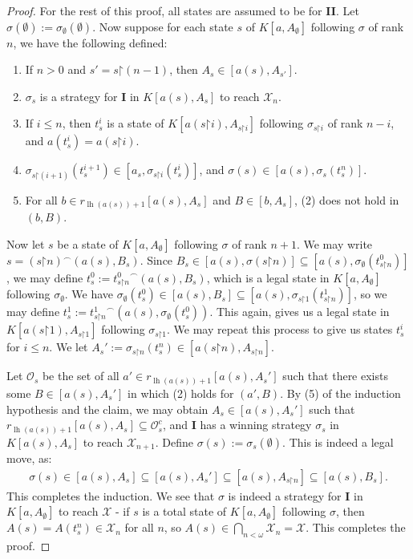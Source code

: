 \documentclass[11pt,reqno]{amsart}
\theoremstyle{plain}
\numberwithin{equation}{section}
\theoremstyle{definition}
\newcommand{\func}{\operatorname}
\newcommand{\cal}{\mathcal}
\newcommand{\restrictedto}{\mathord{\upharpoonright}}
\newcommand{\X}{\cal{X}}
\newcommand{\lh}{\func{lh}}
\renewcommand{\O}{\cal{O}}
\begin{document}
\begin{proof}
    For the rest of this proof, all states are assumed to be for \textbf{II}. Let $\sigma(\emptyset) := \sigma_\emptyset(\emptyset)$. Now suppose for each state $s$ of $K[a,A_\emptyset]$ following $\sigma$ of rank $n$, we have the following defined:
    \begin{enumerate}
        \item If $n > 0$ and $s' = s\restrictedto(n - 1)$, then $A_s \in [a(s),A_{s'}]$.

        \item $\sigma_s$ is a strategy for \textbf{I} in $K[a(s),A_s]$ to reach $\X_n$.

        \item If $i \leq n$, then $t_s^i$ is a state of $K[a(s\restrictedto i),A_{s\restrictedto i}]$ following $\sigma_{s\restrictedto i}$ of rank $n - i$, and $a(t_s^i) = a(s\restrictedto i)$.

        \item $\sigma_{s\restrictedto(i+1)}(t_s^{i+1}) \in [a_s,\sigma_{s\restrictedto i}(t_s^i)]$, and $\sigma(s) \in [a(s),\sigma_s(t_s^n)]$.

        \item For all $b \in r_{\lh(a(s))+1}[a(s),A_s]$ and $B \in [b,A_s]$, (2) does not hold in $(b,B)$.
    \end{enumerate}
    Now let $s$ be a state of $K[a,A_\emptyset]$ following $\sigma$ of rank $n + 1$. We may write $s = (s\restrictedto n)^\frown(a(s),B_s)$. Since $B_s \in [a(s),\sigma(s\restrictedto n)] \subseteq [a(s),\sigma_\emptyset(t_{s\restrictedto n}^0)]$, we may define $t_s^0 := {t_{s\restrictedto n}^0}^\frown(a(s),B_s)$, which is a legal state in $K[a,A_\emptyset]$ following $\sigma_\emptyset$. We have $\sigma_\emptyset(t_s^0) \in [a(s),B_s] \subseteq [a(s),\sigma_{s\restrictedto 1}(t_{s\restrictedto n}^1)]$, so we may define $t_s^1 := {t_{s\restrictedto n}^1}^\frown(a(s),\sigma_\emptyset(t_s^0))$. This again, gives us a legal state in $K[a(s\restrictedto 1),A_{s\restrictedto 1}]$ following $\sigma_{s\restrictedto 1}$. We may repeat this process to give us states $t_s^i$ for $i \leq n$. We let $A_s' := \sigma_{s\restrictedto n}(t_s^n) \in [a(s\restrictedto n),A_{s\restrictedto n}]$. 

    Let $\O_s$ be the set of all $a' \in r_{\lh(a(s))+1}[a(s),A_s']$ such that there exists some $B \in [a(s),A_s']$ in which (2) holds for $(a',B)$. By (5) of the induction hypothesis and the claim, we may obtain $A_s \in [a(s),A_s']$ such that $r_{\lh(a(s))+1}[a(s),A_s] \subseteq \O_s^c$, and \textbf{I} has a winning strategy $\sigma_s$ in $K[a(s),A_s]$ to reach $\X_{n+1}$. Define $\sigma(s) := \sigma_s(\emptyset)$. This is indeed a legal move, as:
    \begin{align*}
        \sigma(s) \in [a(s),A_s] \subseteq [a(s),A_s'] \subseteq [a(s),A_{s\restrictedto n}] \subseteq [a(s),B_s].
    \end{align*}
    This completes the induction. We see that $\sigma$ is indeed a strategy for \textbf{I} in $K[a,A_\emptyset]$ to reach $\X$ - if $s$ is a total state of $K[a,A_\emptyset]$ following $\sigma$, then $A(s) = A(t_s^n) \in \X_n$ for all $n$, so $A(s) \in \bigcap_{n<\omega} \X_n = \X$. This completes the proof.
\end{proof}
\end{document}
